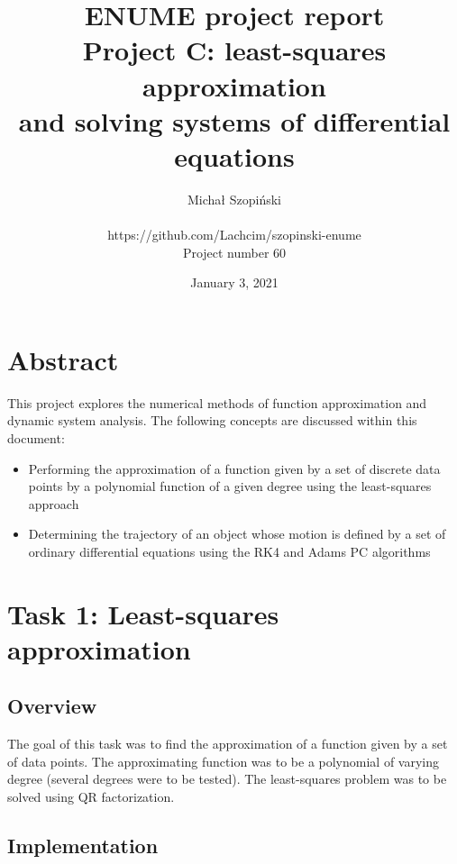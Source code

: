 \documentclass{article}
\begin{document}
	\title{ENUME project report\\Project C: least-squares approximation \\
	and solving systems of differential equations}
	\author{Michał Szopiński\\\\
	https://github.com/Lachcim/szopinski-enume\\
	Project number 60}
	\date{January 3, 2021}
	\maketitle
	
	
	\setcounter{section}{-1}
	\section{Abstract}
	
	This project explores the numerical methods of function approximation
	and dynamic system analysis. The following concepts are discussed within
	this document:
	
	\begin{itemize}
		\item Performing the approximation of a function given by a set of
		discrete data points by a polynomial function of a given degree
		using the least-squares approach
		\item Determining the trajectory of an object whose motion is
		defined by a set of ordinary differential equations using the RK4
		and Adams PC algorithms
	\end{itemize}
	
	\newpage
	
	\section{Task 1: Least-squares approximation}
	
	\subsection{Overview}
	
	The goal of this task was to find the approximation of a function given
	by a set of data points. The approximating function was to be a
	polynomial of varying degree (several degrees were to be tested). The
	least-squares problem was to be solved using QR factorization.
	
	\subsection{Implementation}
	
\end{document}
